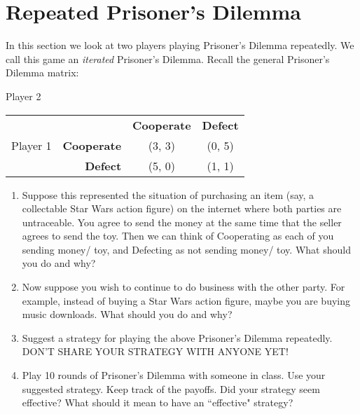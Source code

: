 
\section{Repeated Prisoner's Dilemma}



\vspace{.1in}
In this section we look at two players playing Prisoner's Dilemma repeatedly. We call this game an {\it iterated} Prisoner's Dilemma.
Recall the general Prisoner's Dilemma matrix:

\hspace{3in}Player 2

\begin{center}
\begin{tabular}{l|r|c|c|}\cline{2-4}
&&\textbf{Cooperate}&\textbf{Defect}\\ \cline{2-4}
Player 1&\textbf{Cooperate} &(3, 3)&(0, 5)\\ \cline{2-4}
&\textbf{Defect} &(5, 0)&(1, 1)\\ \cline{2-4}
\end{tabular}
\end{center}
\vspace{.1in}

\begin{enumerate}
\item Suppose this represented the situation of purchasing an item (say, a collectable Star Wars action figure) on the internet where both parties are untraceable. You agree to send the money at the same time that the seller agrees to send the toy. Then we can think of Cooperating as each of you sending money/ toy, and Defecting as not sending money/ toy. What should you do and why?

\item Now suppose you wish to continue to do business with the other party. For example, instead of buying a Star Wars action figure, maybe you are buying music downloads. What should you do and why?

\item Suggest a strategy for playing the above Prisoner's Dilemma repeatedly. DON'T SHARE YOUR STRATEGY WITH ANYONE YET! 

\item Play 10 rounds of Prisoner's Dilemma with someone in class. Use your suggested strategy. Keep track of the payoffs. Did your strategy seem effective? What should it mean to have an ``effective" strategy?
\end{enumerate}


